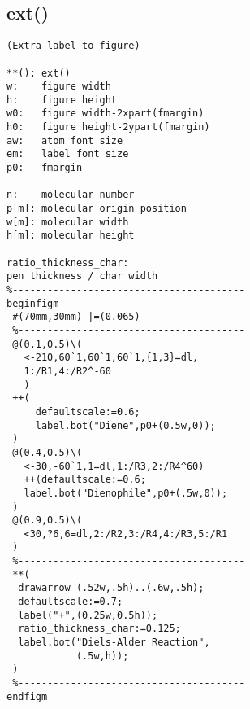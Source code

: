 \documentclass[a4paper]{article}
\begin{document}
\subsection{ext()}
%
\index{**()}%
%
%
%
%
%
%
%
\begin{verbatim}
(Extra label to figure)
 
**(): ext()
w:    figure width
h:    figure height
w0:   figure width-2xpart(fmargin)
h0:   figure height-2ypart(fmargin)
aw:   atom font size
em:   label font size
p0:   fmargin

n:    molecular number
p[m]: molecular origin position
w[m]: molecular width
h[m]: molecular height

ratio_thickness_char:
pen thickness / char width
%----------------------------------------
beginfigm
 #(70mm,30mm) |=(0.065)
 %---------------------------------------
 @(0.1,0.5)\(
   <-210,60`1,60`1,60`1,{1,3}=dl,
   1:/R1,4:/R2^-60
   )
 ++(
     defaultscale:=0.6;
     label.bot("Diene",p0+(0.5w,0));
 )
 @(0.4,0.5)\(
   <-30,-60`1,1=dl,1:/R3,2:/R4^60)
   ++(defaultscale:=0.6;
   label.bot("Dienophile",p0+(.5w,0));
 )
 @(0.9,0.5)\(
   <30,?6,6=dl,2:/R2,3:/R4,4:/R3,5:/R1
 )
 %---------------------------------------
 **(
  drawarrow (.52w,.5h)..(.6w,.5h);
  defaultscale:=0.7;
  label("+",(0.25w,0.5h));
  ratio_thickness_char:=0.125;
  label.bot("Diels-Alder Reaction",
            (.5w,h));
 )
 %---------------------------------------
endfigm
\end{verbatim}
\end{document}
